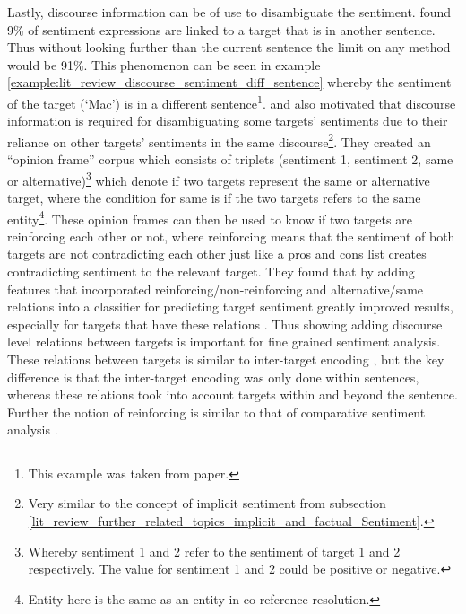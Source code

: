 Lastly, discourse information can be of use to disambiguate the sentiment. \citet{kessler2010icwsm} found 9\% of sentiment expressions are linked to a target that is in another sentence. Thus without looking further than the current sentence the limit on any method would be 91\%. This phenomenon can be seen in example \ref{example:lit_review_discourse_sentiment_diff_sentence} whereby the sentiment of the target (`Mac') is in a different sentence\footnote{This example was taken from \citet{pontiki-etal-2015-semeval} paper.}. \citet{somasundaran-etal-2008-discourse-level} and \citet{somasundaran-etal-2009-opinion} also motivated that discourse information is required for disambiguating some targets' sentiments due to their reliance on other targets' sentiments in the same discourse\footnote{Very similar to the concept of implicit sentiment from subsection \ref{lit_review_further_related_topics_implicit_and_factual_Sentiment}.}. They created an ``opinion frame'' corpus \citep{somasundaran-etal-2008-discourse} which consists of triplets (sentiment 1, sentiment 2, same or alternative)\footnote{Whereby sentiment 1 and 2 refer to the sentiment of target 1 and 2 respectively. The value for sentiment 1 and 2 could be positive or negative.} which denote if two targets represent the same or alternative target, where the condition for same is if the two targets refers to the same entity\footnote{Entity here is the same as an entity in co-reference resolution.}. These opinion frames can then be used to know if two targets are reinforcing each other or not, where reinforcing means that the sentiment of both targets are not contradicting each other just like a pros and cons list creates contradicting sentiment to the relevant target. They found that by adding features that incorporated reinforcing/non-reinforcing and alternative/same relations into a classifier for predicting target sentiment greatly improved results, especially for targets that have these relations \citep{somasundaran-etal-2009-supervised}. Thus showing adding discourse level relations between targets is important for fine grained sentiment analysis. These relations between targets is similar to inter-target encoding \citep{hazarika-etal-2018-modeling}, but the key difference is that the inter-target encoding was only done within sentences, whereas these relations took into account targets within and beyond the sentence. Further the notion of reinforcing is similar to that of comparative sentiment analysis \citep{varathan2017comparative}.


